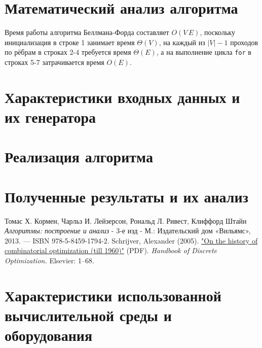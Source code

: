 \documentclass[a4paper,12pt]{article}
\begin{document}
\section{Математический анализ алгоритма}
  Время работы алгоритма Беллмана-Форда составляет $O(V\,E)$, поскольку
  инициализация в строке 1 занимает время $\Theta(V)$, на каждый из $|V| - 1$ 
  проходов по рёбрам в строках 2-4 требуется время $\Theta(E)$, а на выполнение цикла 
  \texttt{for} в строках 5-7 затрачивается время $O(E)$.\cite{cormen}
\section{Характеристики входных данных и их генератора}
\section{Реализация алгоритма}
\section{Полученные результаты и их анализ}
\begin{thebibliography}{9}
    Томас Х. Кормен, Чарльз И. Лейзерсон, Рональд Л. Ривест, Клиффорд Штайн
    \textit{Алгоритмы: построение и анализ}
    - 3-е изд - М.: Издательский дом «Вильямс», 2013. — ISBN 978-5-8459-1794-2.
    Schrijver, Alexander (2005). 
    \href{https://homepages.cwi.nl/~lex/files/histco.pdf}
    {"On the history of combinatorial optimization (till 1960)"} (PDF).
    \textit{Handbook of Discrete Optimization.} Elsevier: 1–68.
\end{thebibliography}
\section{Характеристики использованной вычислительной среды и оборудования}
\end{document}
